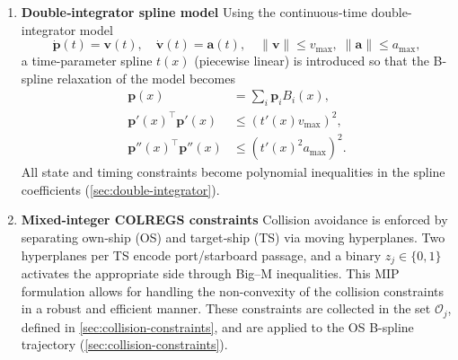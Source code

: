 \begin{enumerate}
  \item \textbf{Double‐integrator spline model}  
    Using the continuous-time double-integrator model
    \begin{equation}
      \dot{\mathbf p}(t)=\mathbf v(t),\quad
      \dot{\mathbf v}(t)=\mathbf a(t),\quad
      \|\mathbf v\|\le v_{\max},\;\|\mathbf a\|\le a_{\max},
    \end{equation}
    a time-parameter spline $t(x)$ (piecewise linear) is introduced so that the B-spline relaxation of the model becomes 
    \begin{equation}
        \begin{aligned}
            \mathbf p(x)&=\sum_i\mathbf p_iB_i(x), \\
            \mathbf p'(x)^\top\mathbf p'(x)&\le (t'(x)v_{\max})^2, \\
            \mathbf p''(x)^\top\mathbf p''(x)&\le (t'(x)^2a_{\max})^2.
        \end{aligned}
    \end{equation}
    All state and timing constraints become polynomial inequalities in the spline coefficients (\cref{sec:double-integrator}).

  \item \textbf{Mixed‐integer COLREGS constraints}  
    Collision avoidance is enforced by separating own‐ship (OS) and target‐ship (TS) via moving hyperplanes. Two hyperplanes per TS encode port/starboard passage, and a binary $z_j\in\{0,1\}$ activates the appropriate side through Big–M inequalities. This MIP formulation allows for handling the non-convexity of the collision constraints in a robust and efficient manner. These constraints are collected in the set $\mathcal{O}_j$, defined in \cref{sec:collision-constraints}, and are applied to the OS B-spline trajectory (\cref{sec:collision-constraints}).


\end{enumerate}
